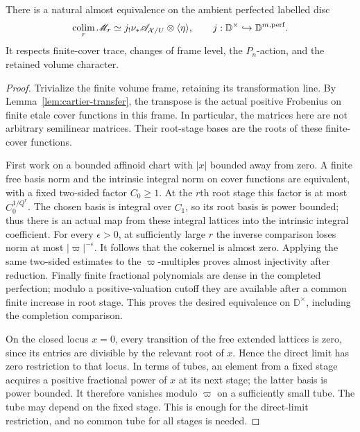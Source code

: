 \begin{lemma}\label{support:positive-extension}
There is a natural almost equivalence on the ambient perfected
labelled disc
\begin{equation}\label{support:positive-extension-equivalence}
 \operatorname*{colim}_r\mathscr M_r
 \simeq j_!\nu_*\mathscr A_{\mathcal X/U}
             \otimes\langle\eta\rangle,
 \qquad j:\mathbb D^\times\hookrightarrow\mathbb D^{m,\mathrm{perf}}.
\end{equation}
It respects finite-cover trace, changes of frame level, the
$P_n$-action, and the retained volume character.
\end{lemma}

\begin{proof}
Trivialize the finite volume frame, retaining its transformation
line.  By Lemma~\ref{lem:cartier-transfer}, the transpose is the
actual positive Frobenius on finite etale cover functions in this
frame.  In particular, the matrices here are not arbitrary
semilinear matrices.  Their root-stage bases are the roots of
these finite-cover functions.

First work on a bounded affinoid chart with $|x|$ bounded away
from zero.  A finite free basis norm and the intrinsic integral
norm on cover functions are equivalent, with a fixed two-sided
factor $C_0\geq1$.  At the $r$th root stage this factor is at most
$C_0^{1/Q^r}$.  The chosen basis is integral over $C_1$, so its
root basis is power bounded; thus there is an actual map from
these integral lattices into the intrinsic integral coefficient.
For every $\epsilon>0$, at sufficiently large $r$ the inverse
comparison loses norm at most $|\varpi|^{-\epsilon}$.  It follows
that the cokernel is almost zero.  Applying the same two-sided
estimates to the $\varpi$-multiples proves almost injectivity
after reduction.  Finally finite fractional polynomials are
dense in the completed perfection; modulo a positive-valuation
cutoff they are available after a common finite increase in
root stage.  This proves the desired equivalence on
$\mathbb D^\times$, including the completion comparison.

On the closed locus $x=0$, every transition of the free extended
lattices is zero, since its entries are divisible by the relevant
root of $x$.  Hence the direct limit has zero restriction to
that locus.  In terms of tubes, an element from a fixed stage
acquires a positive fractional power of $x$ at its next stage;
the latter basis is power bounded.  It therefore vanishes
modulo $\varpi$ on a sufficiently small tube.  The tube may
depend on the fixed stage.  This is enough for the direct-limit
restriction, and no common tube for all stages is needed.


\end{proof}
